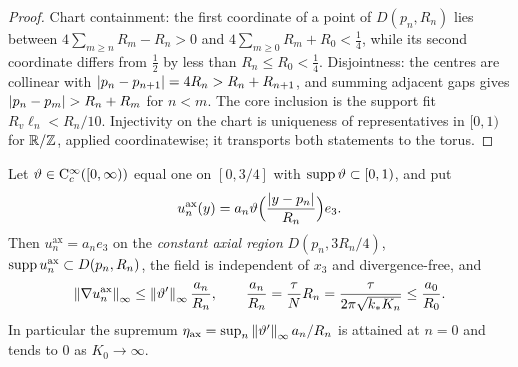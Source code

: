 \begin{proof}
  \leanok
  Chart containment: the first coordinate of a point of $D(p_n,R_n) $ lies between
  $4\sum_{m\geq n}R_m-R_n>0 $ and $4\sum_{m\geq0}R_m+R_0<\tfrac14 $, while its second
  coordinate differs from $\tfrac12 $ by less than $R_n\leq R_0<\tfrac14 $.  Disjointness:
  the centres are collinear with $\left\lvert p_n-p_{n+1}\right\rvert=4R_n>R_n+R_{n+1} $, and summing adjacent
  gaps gives $\left\lvert p_n-p_m\right\rvert>R_n+R_m $ for $n<m $.  The core inclusion is the support fit
  $R_v\ell_n<R_n/10 $.  Injectivity on the chart is uniqueness of representatives in
  $[0,1) $ for $\mathbb{R}/\mathbb{Z} $, applied coordinatewise; it transports both statements to the torus.
\end{proof}

\begin{lemma}
  \label{lem:velocity:axial-plateau}
  \leanok
  Let $\vartheta\in\mathrm{C}^\infty_c([0,\infty)) $ equal one on $[0,3/4] $ with
  $\operatorname{supp}\vartheta\subset[0,1) $, and put
  \[
    u_n^\mathrm{ax}(y)=a_n\vartheta\Bigl(\frac{\left\lvert y-p_n\right\rvert}{R_n}\Bigr)e_3 .
  \]
  Then $u_n^\mathrm{ax}=a_ne_3 $ on the \emph{constant axial region} $D(p_n,3R_n/4) $,
  $\operatorname{supp} u_n^\mathrm{ax}\subset D(p_n,R_n) $, the field is independent of $x_3 $ and
  divergence-free, and
  \[
    \left\|\nabla u_n^\mathrm{ax}\right\|_\infty\leq\left\|\vartheta'\right\|_\infty\frac{a_n}{R_n},
    \qquad
    \frac{a_n}{R_n}=\frac{\tau}{N}R_n=\frac{\tau}{2\pi\sqrt{k_*K_n}}
    \leq\frac{a_0}{R_0} .
  \]
  In particular the supremum
  $\eta_\mathrm{ax}=\sup_n\left\|\vartheta'\right\|_\infty a_n/R_n $ is attained at $n=0 $ and tends to
  $0 $ as $K_0\to\infty $.
\end{lemma}

